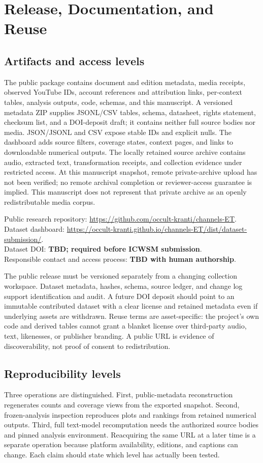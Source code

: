 \section{Release, Documentation, and Reuse}
\subsection{Artifacts and access levels}
The public package contains document and edition metadata, media receipts, observed YouTube IDs, account references and attribution links, per-context tables, analysis outputs, code, schemas, and this manuscript. A versioned metadata ZIP supplies JSONL/CSV tables, schema, datasheet, rights statement, checksum list, and a DOI-deposit draft; it contains neither full source bodies nor media. JSON/JSONL and CSV expose stable IDs and explicit nulls. The dashboard adds source filters, coverage states, context pages, and links to downloadable numerical outputs. The locally retained source archive contains audio, extracted text, transformation receipts, and collection evidence under restricted access. At this manuscript snapshot, remote private-archive upload has not been verified; no remote archival completion or reviewer-access guarantee is implied. This manuscript does not represent that private archive as an openly redistributable media corpus.

\noindent Public research repository: \url{https://github.com/occult-kranti/channels-ET}.\\
Dataset dashboard: \url{https://occult-kranti.github.io/channels-ET/dist/dataset-submission/}.\\
Dataset DOI: \textbf{TBD; required before ICWSM submission}.\\
Responsible contact and access process: \textbf{TBD with human authorship}.

The public release must be versioned separately from a changing collection workspace. Dataset metadata, hashes, schema, source ledger, and change log support identification and audit. A future DOI deposit should point to an immutable contributed dataset with a clear license and retained metadata even if underlying assets are withdrawn. Reuse terms are asset-specific: the project's own code and derived tables cannot grant a blanket license over third-party audio, text, likenesses, or publisher branding. A public URL is evidence of discoverability, not proof of consent to redistribution.

\subsection{Reproducibility levels}
Three operations are distinguished. First, public-metadata reconstruction regenerates counts and coverage views from the exported snapshot. Second, frozen-analysis inspection reproduces plots and rankings from retained numerical outputs. Third, full text-model recomputation needs the authorized source bodies and pinned analysis environment. Reacquiring the same URL at a later time is a separate operation because platform availability, editions, and captions can change. Each claim should state which level has actually been tested.

